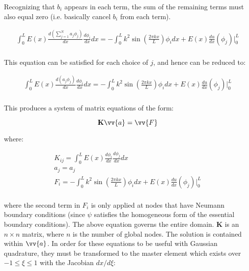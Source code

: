 \documentclass[10pt]{article}
\begin{document}
Recognizing that \(b_i\) appears in each term, the sum of the remaining terms must also equal zero (i.e. basically cancel \(b_i\) from each term).

\begin{equation}
\begin{aligned}
\int_{0}^{L}E(x)\frac{d\left(\sum_{j=1}^{N}a_j\phi_j\right)}{dx}\frac{d\phi_i}{dx}dx=-\int_{0}^{L}k^2\sin{\left(\frac{2\pi kx}{L}\right)}\phi_idx+E(x)\frac{du}{dx}\left(\phi_j\right)\biggr\vert_{0}^{L}\\
\end{aligned}
\end{equation}

This equation can be satisfied for each choice of \(j\), and hence can be reduced to:

\begin{equation}
\begin{aligned}
\int_{0}^{L}E(x)\frac{d\left(a_j\phi_j\right)}{dx}\frac{d\phi_i}{dx}dx=-\int_{0}^{L}k^2\sin{\left(\frac{2\pi kx}{L}\right)}\phi_idx+E(x)\frac{du}{dx}\left(\phi_j\right)\biggr\vert_{0}^{L}\\
\end{aligned}
\end{equation}

This produces a system of matrix equations of the form:

\begin{equation}
\label{eq:MatrixEqn}
\textbf{K}\vv{a}=\vv{F}
\end{equation}

where:

\begin{equation}
\begin{aligned}
K_{ij}=\int_{0}^{L}E(x)\frac{d\phi_i}{dx}\frac{d\phi_j}{dx}dx\\
a_j=a_j\\
F_i=-\int_{0}^{L}k^2\sin{\left(\frac{2\pi kx}{L}\right)}\phi_idx+E(x)\frac{du}{dx}\left(\phi_j\right)\biggr\vert_{0}^{L}\\
\end{aligned}
\end{equation}

where the second term in \(F_i\) is only applied at nodes that have Neumann boundary conditions (since \(\psi\) satisfies the homogeneous form of the essential boundary conditions). The above equation governs the entire domain. \(\textbf{K}\) is an \(n \times n\) matrix, where \(n\) is the number of global nodes. The solution is contained within \(\vv{a}\). In order for these equations to be useful with Gaussian quadrature, they must be transformed to the master element which exists over \(-1\leq\xi\leq1\) with the Jacobian \(dx/d\xi\):
\end{document}
